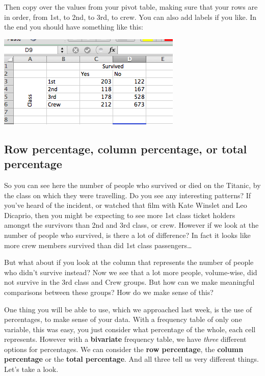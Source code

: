 \documentclass[
]{book}
\begin{document}
Then copy over the values from your pivot table, making sure that your rows are in order, from 1st, to 2nd, to 3rd, to crew. You can also add labels if you like. In the end you should have something like this:

\includegraphics{imgs/titanic_freq.png}

\hypertarget{row-percentage-column-percentage-or-total-percentage}{%
\subsection{Row percentage, column percentage, or total percentage}\label{row-percentage-column-percentage-or-total-percentage}}

So you can see here the number of people who survived or died on the Titanic, by the class on which they were travelling. Do you see any interesting patterns? If you've heard of the incident, or watched that film with Kate Winslet and Leo Dicaprio, then you might be expecting to see more 1st class ticket holders amongst the survivors than 2nd and 3rd class, or crew. However if we look at the number of people who survived, is there a lot of difference? In fact it looks like more crew members survived than did 1st class passengers\ldots{}

But what about if you look at the column that represents the number of people who didn't survive instead? Now we see that a lot more people, volume-wise, did not survive in the 3rd class and Crew groups. But how can we make meaningful comparisons between these groups? How do we make sense of this?

One thing you will be able to use, which we approached last week, is the use of percentages, to make sense of your data. With a frequency table of only one variable, this was easy, you just consider what percentage of the whole, each cell represents. However with a \textbf{bivariate} frequency table, we have \emph{three} different options for percentages. We can consider the \textbf{row percentage}, the \textbf{column percentage} or the \textbf{total percentage}. And all three tell us very different things. Let's take a look.
\end{document}
